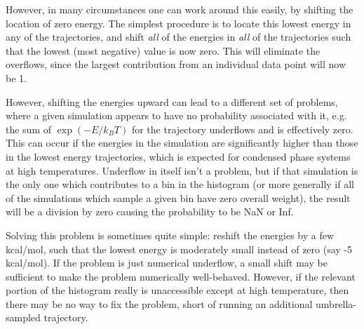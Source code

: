 \documentclass[12pt]{article}
\begin{document}
However, in many circumstances one can work around this easily, by shifting
the location of zero energy.  The simplest procedure is to locate this lowest
energy in any of the trajectories, and shift \emph{all} of the energies in
\emph{all} of the trajectories such that the lowest (most negative) value is
now zero.  This will eliminate the overflows, since the largest contribution
from an individual data point will now be 1.

However, shifting the energies upward can lead to a different set of
problems, where a given simulation appears to have no probability associated
with it, e.g. the sum of $\exp(-E/k_B T)$ for the trajectory underflows and
is effectively zero.  This can occur if the energies in the simulation are
significantly higher than those in the lowest energy trajectories, which is
expected for condensed phase systems at high temperatures. Underflow in
itself isn't a problem, but if that simulation is the only one which
contributes to a bin in the histogram (or more generally if all of the
simulations which sample a given bin have zero overall weight), the result
will be a division by zero causing the probability to be NaN or Inf.

Solving this problem is sometimes quite simple: reshift the energies by a few
kcal/mol, such that the lowest energy is moderately small instead of zero
(say -5 kcal/mol).  If the problem is just numerical underflow, a small shift
may be sufficient to make the problem numerically well-behaved.  However, if
the relevant portion of the histogram really is unaccessible except at high
temperature, then there may be no way to fix the problem, short of running an
additional umbrella-sampled trajectory.
\end{document}
